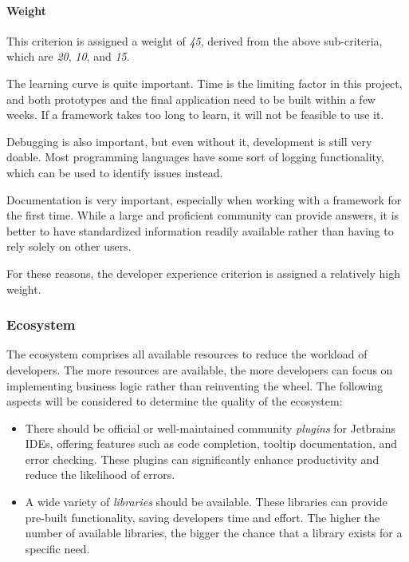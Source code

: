 \paragraph{Weight}
This criterion is assigned a weight of \emph{45}, derived from the above sub-criteria, which are \emph{20}, \emph{10}, and \emph{15}.

The learning curve is quite important.
Time is the limiting factor in this project, and both prototypes and the final application need to be built within a few weeks.
If a framework takes too long to learn, it will not be feasible to use it.

Debugging is also important, but even without it, development is still very doable.
Most programming languages have some sort of logging functionality, which can be used to identify issues instead.

Documentation is very important, especially when working with a framework for the first time.
While a large and proficient community can provide answers, it is better to have standardized information readily available rather than having to rely solely on other users.

For these reasons, the developer experience criterion is assigned a relatively high weight.

\subsubsection{Ecosystem}\label{subsubsec:ecosystem}
The ecosystem comprises all available resources to reduce the workload of developers.
The more resources are available, the more developers can focus on implementing business logic rather than reinventing the wheel.
The following aspects will be considered to determine the quality of the ecosystem:

\begin{itemize}
	\item There should be official or well-maintained community \emph{plugins} for Jetbrains IDEs, offering features such as code completion, tooltip documentation, and error checking.
	      These plugins can significantly enhance productivity and reduce the likelihood of errors.
	\item A wide variety of \emph{libraries} should be available.
	      These libraries can provide pre-built functionality, saving developers time and effort.
	      The higher the number of available libraries, the bigger the chance that a library exists for a specific need.
\end{itemize}

